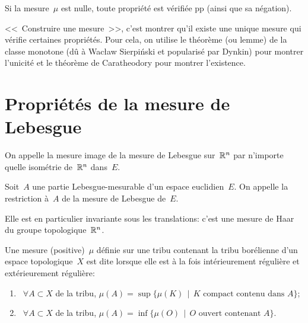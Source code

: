 Si la mesure~$\mu$ est nulle, toute propriété est vérifiée pp (ainsi que sa négation).

\medskip
{}
<<~Construire une mesure~>>, c'est montrer qu'il existe une unique mesure qui vérifie certaines propriétés. 
Pour cela, on utilise le théorème (ou lemme) de la classe monotone (dû à Wacław Sierpiński 
et popularisé par Dynkin) pour montrer l'unicité et le 
théorème de Caratheodory pour montrer l'existence.

\section{Propriétés de la mesure de Lebesgue}

On appelle 
la mesure image de la mesure de Lebesgue
sur~$\mathbb R^n$ par n'importe quelle isométrie de~$\mathbb R^n$ dans~$E$.

Soit~$A$ une partie Lebesgue-mesurable d'un espace euclidien~$E$.
On appelle  la restriction à~$A$ de la mesure de Lebesgue de~$E$.

\begin{theoreme}
Elle est en particulier invariante sous les translations: c'est une mesure de Haar 
du groupe topologique~$\mathbb R^n$.
\end{theoreme}


\begin{definition}
Une mesure (positive)~$\mu$ définie sur une tribu contenant la tribu borélienne d'un espace
topologique~$X$ est dite  lorsque elle est
à la fois intérieurement régulière et extérieurement régulière:
\begin{enumerate}
\item~$\forall A\subset X$ de la tribu, $\mu(A)=\sup\{\mu(K)\,\mid\, K \text{ compact contenu dans } A\}$;
\item~$\forall A\subset X$ de la tribu, $\mu(A)=\inf\{\mu(O)\,\mid\, O \text{ ouvert contenant } A\}$.
\end{enumerate}
\end{definition}

